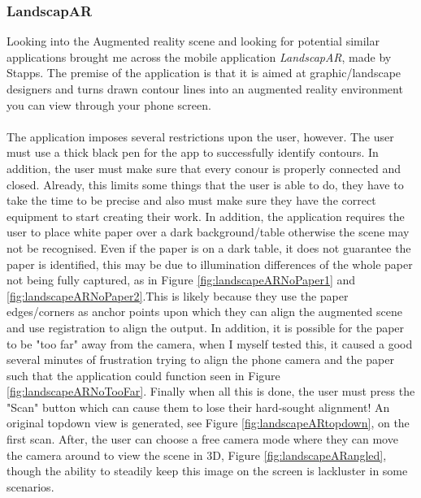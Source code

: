 \documentclass[11pt]{article}
\begin{document}
\subsubsection{LandscapAR}
\label{LandscapAR}
Looking into the Augmented reality scene and looking for potential similar
applications brought me across the mobile application \textit{LandscapAR},
made by Stapps. The premise of the application is that it is aimed at
graphic/landscape designers and turns drawn contour lines into an augmented
reality environment you can view through your phone screen. \\
\\
The application imposes several restrictions upon the user, however. The user
must use a thick black pen for the app to successfully identify contours. 
In addition, the user must make sure that every conour is properly connected
and closed. Already, this limits some things that the user is able to do, they
have to take the time to be precise and also must make sure they have the 
correct equipment to start creating their work. In addition, the application
requires the user to place white paper over a dark background/table otherwise
the scene may not be recognised. Even if the paper is on a dark table, it 
does not guarantee the paper is identified, this may be due to illumination
differences of the whole paper not being fully captured, as in 
Figure \ref{fig:landscapeARNoPaper1} and \ref{fig:landscapeARNoPaper2}.This 
is likely because they use 
the paper edges/corners as anchor points upon which they can align the 
augmented scene and use registration to align the output. In addition, it
is possible for the paper to be "too far" away from the camera, when I
myself tested this, it caused a good several minutes of frustration trying
to align the phone camera and the paper such that the application could 
function seen in Figure \ref{fig:landscapeARNoTooFar}. 
Finally when all this is done, the user must press the "Scan" button
which can cause them to lose their hard-sought alignment! An original
topdown view is generated, see Figure \ref{fig:landscapeARtopdown}, on
the first scan. After, the user can choose a free camera mode where they 
can move the camera around to view the scene in 3D, 
Figure \ref{fig:landscapeARangled}, though the ability to steadily
keep this image on the screen is lackluster in some scenarios.  \\
\end{document}
